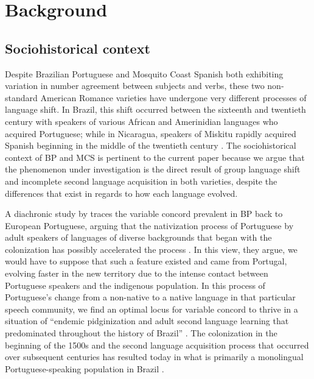 \documentclass[output=paper,colorlinks,citecolor=brown,
]{langscibook}
\begin{document}
\section{Background}

\subsection{Sociohistorical context}

Despite Brazilian Portuguese and Mosquito Coast Spanish both exhibiting variation in number agreement between subjects and verbs, these two non-standard American Romance varieties have undergone very different processes of language shift. In Brazil, this shift occurred between the sixteenth and twentieth century with speakers of various African and Amerinidian languages who acquired Portuguese; while in Nicaragua, speakers of Miskitu rapidly acquired Spanish beginning in the middle of the twentieth century \citep[238]{naro2000variable}. The sociohistorical context of BP and MCS is pertinent to the current paper because we argue that the phenomenon under investigation is the direct result of group language shift and incomplete second language acquisition in both varieties, despite the differences that exist in regards to how each language evolved.

A diachronic study by \cite{naro2000variable} traces the variable concord prevalent in BP back to European Portuguese, arguing that the nativization process of Portuguese by adult speakers of languages of diverse backgrounds that began with the colonization has possibly accelerated the process \citep[40]{scherre2001origens}. In this view, they argue, we would have to suppose that such a feature existed and came from Portugal, evolving faster in the new territory due to the intense contact between Portuguese speakers and the indigenous population. In this process of Portuguese's change from a non-native to a native language in that particular speech community, we find an optimal locus for variable concord to thrive in a situation of 
``endemic pidginization and adult second language learning that predominated throughout the history of Brazil'' \citep[237]{scherre2010}. The colonization in the beginning of the 1500s and the second language acquisition process that occurred over subsequent centuries has resulted today in what is primarily a monolingual Portuguese-speaking population in Brazil \citep{lucchesi2009portugues}. 
\end{document}
